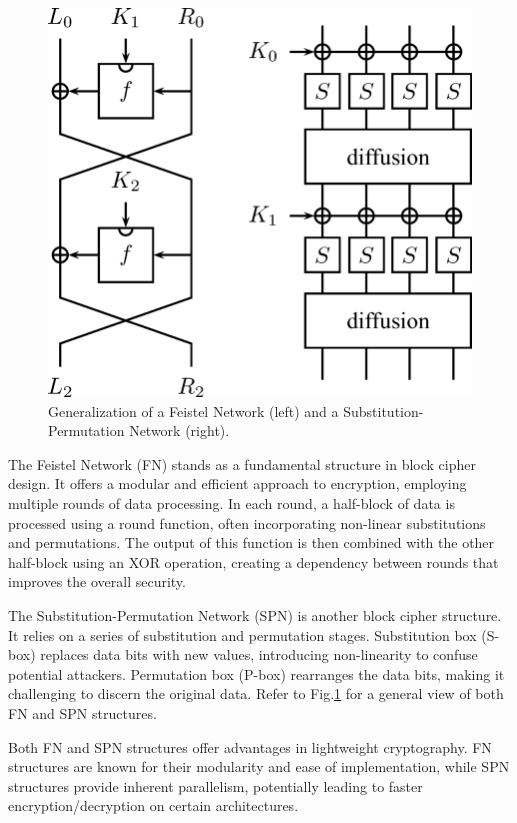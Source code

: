 \documentclass[conference]{IEEEtran}
\begin{document}
\begin{figure}
    \centering
    \includegraphics[width=\columnwidth]{figures/FEISTEL-SPN.png}
    \caption{Generalization of a Feistel Network (left) and a Substitution-Permutation Network (right)\cite{de2006introduction}.}
    \label{fig:FEISTEL-SPN}
\end{figure}

The Feistel Network (FN) stands as a fundamental structure in block cipher design. It offers a modular and efficient approach to encryption, employing multiple rounds of data processing. In each round, a half-block of data is processed using a round function, often incorporating non-linear substitutions and permutations. The output of this function is then combined with the other half-block using an XOR operation, creating a dependency between rounds that improves the overall security\cite{FEISTEL}.

The Substitution-Permutation Network (SPN) is another block cipher structure. It relies on a series of substitution and permutation stages. Substitution box (S-box) replaces data bits with new values, introducing non-linearity to confuse potential attackers. Permutation box (P-box) rearranges the data bits, making it challenging to discern the original data\cite{heys1996substitution}. Refer to Fig.\ref{fig:FEISTEL-SPN} for a general view of both FN and SPN structures.

Both FN and SPN structures offer advantages in lightweight cryptography. FN structures are known for their modularity and ease of implementation, while SPN structures provide inherent parallelism, potentially leading to faster encryption/decryption on certain architectures.
\end{document}
